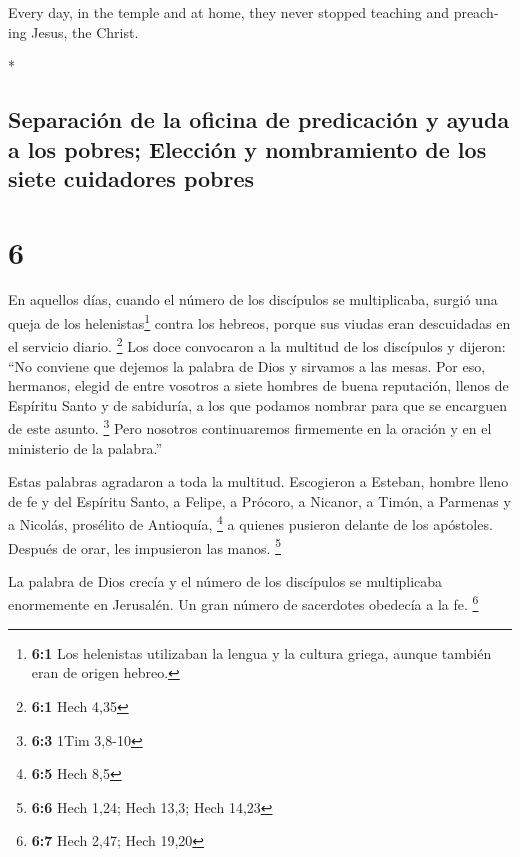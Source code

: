 \begin{paracol}{2}
\begin{otherlanguage}{english}
 Every day, in the temple and at home, they never stopped
teaching and preaching Jesus, the Christ.

\end{otherlanguage}

\switchcolumn[0]*

\hypertarget{separaciuxf3n-de-la-oficina-de-predicaciuxf3n-y-ayuda-a-los-pobres-elecciuxf3n-y-nombramiento-de-los-siete-cuidadores-pobres}{%
\subsection{Separación de la oficina de predicación y ayuda a los
pobres; Elección y nombramiento de los siete cuidadores
pobres}\label{separaciuxf3n-de-la-oficina-de-predicaciuxf3n-y-ayuda-a-los-pobres-elecciuxf3n-y-nombramiento-de-los-siete-cuidadores-pobres}}

\hypertarget{section-10}{%
\section{6}\label{section-10}}

 En aquellos días, cuando el número de los discípulos se
multiplicaba, surgió una queja de los helenistas\footnote{\textbf{6:1}
  Los helenistas utilizaban la lengua y la cultura griega, aunque
  también eran de origen hebreo.} contra los hebreos, porque sus viudas
eran descuidadas en el servicio diario. \footnote{\textbf{6:1} Hech 4,35}
 Los doce convocaron a la multitud de los discípulos y
dijeron: ``No conviene que dejemos la palabra de Dios y sirvamos a las
mesas.  Por eso, hermanos, elegid de entre vosotros a
siete hombres de buena reputación, llenos de Espíritu Santo y de
sabiduría, a los que podamos nombrar para que se encarguen de este
asunto. \footnote{\textbf{6:3} 1Tim 3,8-10}  Pero nosotros
continuaremos firmemente en la oración y en el ministerio de la
palabra.''

 Estas palabras agradaron a toda la multitud. Escogieron a
Esteban, hombre lleno de fe y del Espíritu Santo, a Felipe, a Prócoro, a
Nicanor, a Timón, a Parmenas y a Nicolás, prosélito de Antioquía,
\footnote{\textbf{6:5} Hech 8,5}  a quienes pusieron
delante de los apóstoles. Después de orar, les impusieron las manos.
\footnote{\textbf{6:6} Hech 1,24; Hech 13,3; Hech 14,23}

 La palabra de Dios crecía y el número de los discípulos
se multiplicaba enormemente en Jerusalén. Un gran número de sacerdotes
obedecía a la fe. \footnote{\textbf{6:7} Hech 2,47; Hech 19,20}


\end{paracol}
